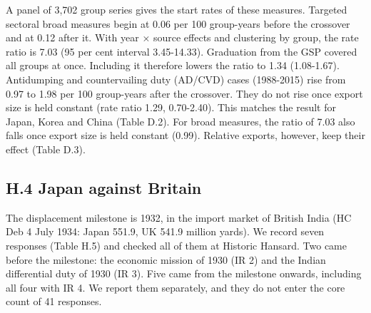 A panel of 3,702 group series gives the start rates of these measures.
Targeted sectoral broad measures begin at 0.06 per 100 group-years
before the crossover and at 0.12 after it. With year × source effects
and clustering by group, the rate ratio is 7.03 (95 per cent interval
3.45-14.33). Graduation from the GSP covered all groups at once.
Including it therefore lowers the ratio to 1.34 (1.08-1.67). Antidumping
and countervailing duty (AD/CVD) cases (1988-2015) rise from 0.97 to
1.98 per 100 group-years after the crossover. They do not rise once
export size is held constant (rate ratio 1.29, 0.70-2.40). This matches
the result for Japan, Korea and China (Table D.2). For broad measures,
the ratio of 7.03 also falls once export size is held constant (0.99).
Relative exports, however, keep their effect (Table D.3).

\hypertarget{h.4-japan-against-britain}{%
\subsection*{H.4 Japan against Britain}\label{h.4-japan-against-britain}}

The displacement milestone is 1932, in the import market of British
India (HC Deb 4 July 1934: Japan 551.9, UK 541.9 million yards). We
record seven responses (Table H.5) and checked all of them at Historic
Hansard. Two came before the milestone: the economic mission of 1930 (IR
2) and the Indian differential duty of 1930 (IR 3). Five came from the
milestone onwards, including all four with IR 4. We report them
separately, and they do not enter the core count of 41 responses.

